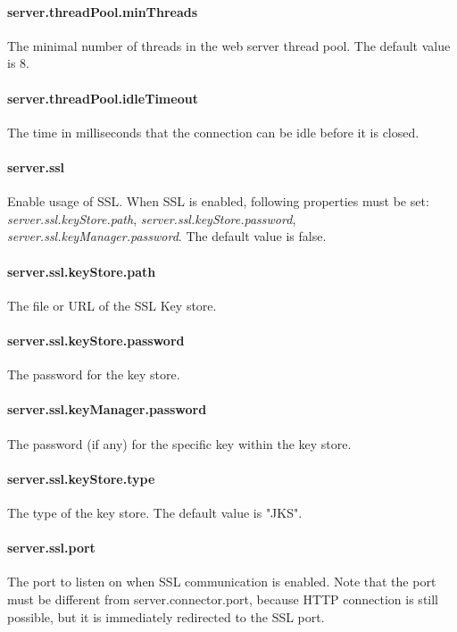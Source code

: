 \paragraph{server.threadPool.minThreads}
The minimal number of threads in the web server thread pool. The default value
is 8.

\paragraph{server.threadPool.idleTimeout}
The time in milliseconds that the connection can be idle before it is closed.

\paragraph{server.ssl}
Enable usage of SSL. When SSL is enabled, following properties must be set:
\emph{server.ssl.keyStore.path}, \emph{server.ssl.keyStore.password}, \emph{server.ssl.keyManager.password}. The default value is false.

\paragraph{server.ssl.keyStore.path}
The file or URL of the SSL Key store.

\paragraph{server.ssl.keyStore.password}
The password for the key store.

\paragraph{server.ssl.keyManager.password}
The password (if any) for the specific key within the key store.

\paragraph{server.ssl.keyStore.type}
The type of the key store. The default value is "JKS".

\paragraph{server.ssl.port}
The port to listen on when SSL communication is enabled. Note that the port must
be different from server.connector.port, because HTTP connection is still
possible, but it is immediately redirected to the SSL port.

